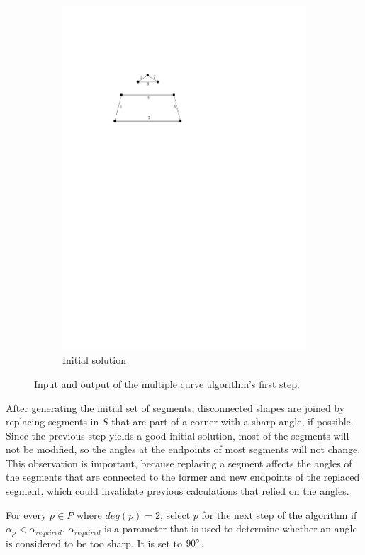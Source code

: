\documentclass[11pt]{article}
\begin{document}
\begin{figure}[hbtp]
\begin{subfigure}{.33\linewidth}
  \includegraphics[width=0.9\linewidth]{multiplecurves/algo_step1_add_lines_with_numbers.pdf}
  \caption{Initial solution}
\end{subfigure}%
  \caption{Input and output of the multiple curve algorithm's first step.}
\label{fig:multiple_initial_solution}
\end{figure}

After generating the initial set of segments, disconnected shapes are joined by replacing segments in $S$ that are part of a corner with a sharp angle, if possible. Since the previous step yields a good initial solution, most of the segments will not be modified, so the angles at the endpoints of most segments will not change. This observation is important, because replacing a segment affects the angles of the segments that are connected to the former and new endpoints of the replaced segment, which could invalidate previous calculations that relied on the angles.

For every $p \in P$ where $deg(p) = 2$, select $p$ for the next step of the algorithm if $\alpha_p < \alpha_{required}$. $\alpha_{required}$ is a parameter that is used to determine whether an angle is considered to be too sharp. It is set to $90\degree$.
\end{document}
